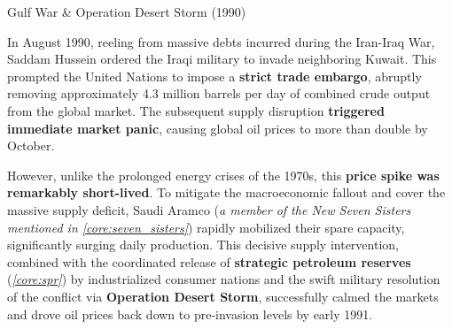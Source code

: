\documentclass[10pt]{article}
\begin{document}
      \begin{core}{Gulf War \& Operation Desert Storm (1990)}

        In August 1990, reeling from massive debts incurred during the Iran-Iraq War, Saddam Hussein ordered the Iraqi military to invade neighboring Kuwait. This prompted the United Nations to impose a \textbf{strict trade embargo}, abruptly removing approximately 4.3 million barrels per day of combined crude output from the global market. The subsequent supply disruption \textbf{triggered immediate market panic}, causing global oil prices to more than double by October. 


        However, unlike the prolonged energy crises of the 1970s, this \textbf{price spike was remarkably short-lived}. To mitigate the macroeconomic fallout and cover the massive supply deficit, Saudi Aramco (\textit{a member of the New Seven Sisters mentioned in \autoref{core:seven_sisters}}) rapidly mobilized their spare capacity, significantly surging daily production. This decisive supply intervention, combined with the coordinated release of \textbf{strategic petroleum reserves} (\textit{\autoref{core:spr}}) by industrialized consumer nations and the swift military resolution of the conflict via \textbf{Operation Desert Storm}, successfully calmed the markets and drove oil prices back down to pre-invasion levels by early 1991.


      \end{core}
\end{document}
